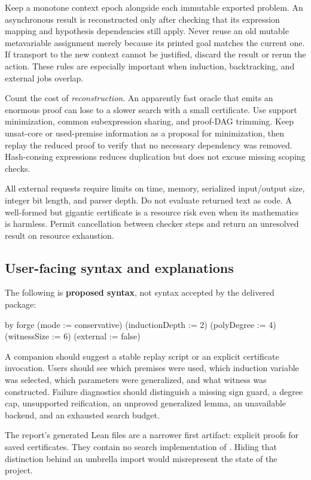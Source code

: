 Keep a monotone context epoch alongside each immutable exported problem. An
asynchronous result is reconstructed only after checking that its expression
mapping and hypothesis dependencies still apply. Never reuse an old mutable
metavariable assignment merely because its printed goal matches the current
one. If transport to the new context cannot be justified, discard the result
or rerun the action. These rules are especially important when induction,
backtracking, and external jobs overlap.

Count the cost of \emph{reconstruction}. An apparently fast oracle that emits
an enormous proof can lose to a slower search with a small certificate. Use
support minimization, common subexpression sharing, and proof-DAG trimming.
Keep unsat-core or used-premise information as a proposal for minimization,
then replay the reduced proof to verify that no necessary dependency was
removed. Hash-consing expressions reduces duplication but does not excuse
missing scoping checks.

All external requests require limits on time, memory, serialized input/output
size, integer bit length, and parser depth. Do not evaluate returned text as
code. A well-formed but gigantic certificate is a resource risk even when its
mathematics is harmless. Permit cancellation between checker steps and return
an unresolved result on resource exhaustion.

\subsection{User-facing syntax and explanations}

The following is \textbf{proposed syntax}, not syntax accepted by the delivered
package:
\begin{Code}
by
  forge (mode := conservative)
    (inductionDepth := 2)
    (polyDegree := 4)
    (witnessSize := 6)
    (external := false)
\end{Code}

A companion  should suggest a stable replay script or an explicit
certificate invocation. Users should see which premises were used, which
induction variable was selected, which parameters were generalized, and what
witness was constructed. Failure diagnostics should distinguish a missing
sign guard, a degree cap, unsupported reification, an unproved generalized
lemma, an unavailable backend, and an exhausted search budget.

The report's generated Lean files are a narrower first artifact: explicit
proofs for saved certificates. They contain no search implementation of
\forge. Hiding that distinction behind an umbrella import would misrepresent
the state of the project.

